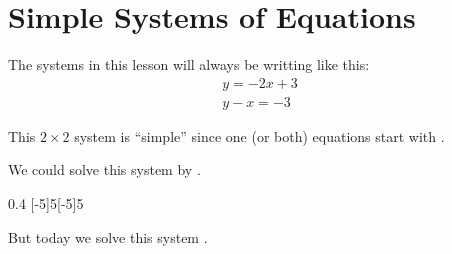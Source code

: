 \section{Simple Systems of Equations}

The systems in this lesson will always be writting like this:
\begin{align*}
    y = -2x + 3 \\
    y-x = -3
\end{align*}

\begin{tcolorbox}[center,width=4in]
    This $2\times2$ system is ``simple'' since one (or both) equations start with 
    .
\end{tcolorbox}
We could solve this system by .

\begin{center}
    \begin{myTikzpictureGrid}{0.4} [-5]{5}[-5]{5}
        \end{myTikzpictureGrid}
\end{center}
%
But today we solve this system 
.